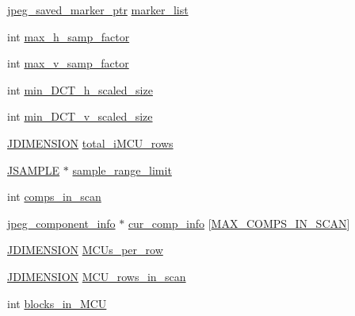 \begin{DoxyCompactItemize}
\item 
\hyperlink{jpeglib_8h_a2efb5205b3e81589f2dc133f1a412bb0}{jpeg\+\_\+saved\+\_\+marker\+\_\+ptr} \hyperlink{structjpeg__decompress__struct_a28761988a8f06e80619169e09412b27a}{marker\+\_\+list}
\item 
int \hyperlink{structjpeg__decompress__struct_a3c7351d6faa7604cfc60ce3346aa64fa}{max\+\_\+h\+\_\+samp\+\_\+factor}
\item 
int \hyperlink{structjpeg__decompress__struct_ac502831dd72cbe2663eb06f98cf0a489}{max\+\_\+v\+\_\+samp\+\_\+factor}
\item 
int \hyperlink{structjpeg__decompress__struct_a8a89345d171d3f17315c9778cb634e6e}{min\+\_\+\+D\+C\+T\+\_\+h\+\_\+scaled\+\_\+size}
\item 
int \hyperlink{structjpeg__decompress__struct_a91ac3f0ca9c554b1690a0d18bc351762}{min\+\_\+\+D\+C\+T\+\_\+v\+\_\+scaled\+\_\+size}
\item 
\hyperlink{jmorecfg_8h_a04ed4674f6f1d0d50ec241531e38274f}{J\+D\+I\+M\+E\+N\+S\+I\+O\+N} \hyperlink{structjpeg__decompress__struct_ab210038772e2c74c35b6c0a36db9c6a9}{total\+\_\+i\+M\+C\+U\+\_\+rows}
\item 
\hyperlink{jmorecfg_8h_a552ee7787d3fd8b5f5f5cc3e2145a647}{J\+S\+A\+M\+P\+L\+E} $\ast$ \hyperlink{structjpeg__decompress__struct_a7208357f11ec6db26e55d7b01d8c7a1b}{sample\+\_\+range\+\_\+limit}
\item 
int \hyperlink{structjpeg__decompress__struct_a2a28db865b9d49bfa9bc6335abf331c3}{comps\+\_\+in\+\_\+scan}
\item 
\hyperlink{structjpeg__component__info}{jpeg\+\_\+component\+\_\+info} $\ast$ \hyperlink{structjpeg__decompress__struct_ab640afe8fb70108caed0c2520aab0c2a}{cur\+\_\+comp\+\_\+info} \mbox{[}\hyperlink{jpeglib_8h_adc7013da016c19051dc623fb3d8b35b4}{M\+A\+X\+\_\+\+C\+O\+M\+P\+S\+\_\+\+I\+N\+\_\+\+S\+C\+A\+N}\mbox{]}
\item 
\hyperlink{jmorecfg_8h_a04ed4674f6f1d0d50ec241531e38274f}{J\+D\+I\+M\+E\+N\+S\+I\+O\+N} \hyperlink{structjpeg__decompress__struct_aafebfaa0046cc8b449ce2401c174697f}{M\+C\+Us\+\_\+per\+\_\+row}
\item 
\hyperlink{jmorecfg_8h_a04ed4674f6f1d0d50ec241531e38274f}{J\+D\+I\+M\+E\+N\+S\+I\+O\+N} \hyperlink{structjpeg__decompress__struct_a6d1110064a4f2fbc46a8831fd148bca6}{M\+C\+U\+\_\+rows\+\_\+in\+\_\+scan}
\item 
int \hyperlink{structjpeg__decompress__struct_a76d2872b589796cb8d66428e660e37fb}{blocks\+\_\+in\+\_\+\+M\+C\+U}
\item 

\end{DoxyCompactItemize}
